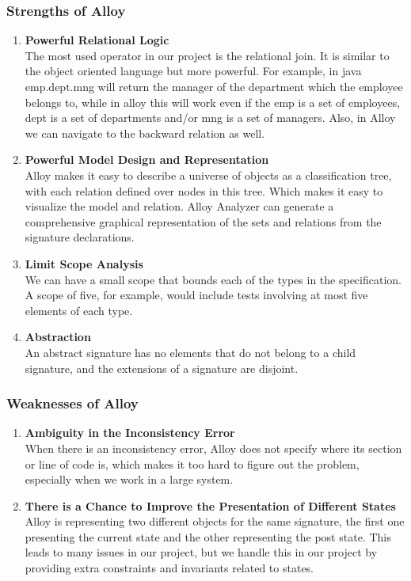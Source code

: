 \documentclass[titlepage]{article}
\begin{document}
\subsubsection{Strengths of Alloy}
\begin{enumerate}
	\item \textbf{Powerful Relational Logic} \\
	      The most used operator in our project is the relational join. It is similar to the object oriented language but more powerful. For example, in java emp.dept.mng will return the manager of the department which the employee belongs to, while in alloy this will work even if the emp is a set of employees, dept is a set of departments and/or mng is a set of managers. Also, in Alloy we can navigate to the backward relation as well.
	\item \textbf{Powerful Model Design and Representation} \\
	      Alloy makes it easy to describe a universe of objects as a classification tree, with each relation defined over nodes in this tree. Which makes it easy to visualize the model and relation. Alloy Analyzer can generate a comprehensive graphical representation of the sets and relations from the signature declarations.
	\item \textbf{Limit Scope Analysis} \\
	      We can have a small scope that bounds each of the types in the specification. A scope of five, for example, would include tests involving at most five elements of each type.
	\item \textbf{Abstraction} \\
	      An abstract signature has no elements that do not belong to a child signature, and the extensions of a signature are disjoint.
\end{enumerate}
\subsubsection{Weaknesses of Alloy}
\begin{enumerate}
	\item \textbf{Ambiguity in the Inconsistency Error} \\
	      When there is an inconsistency error, Alloy does not specify where its section or line of code is, which makes it too hard to figure out the problem, especially when we work in a large system.
	\item \textbf{There is a Chance to Improve the Presentation of Different States} \\
	      Alloy is representing two different objects for the same signature, the first one presenting the current state and the other representing the post state. This leads to many issues in our project, but we handle this in our project by providing extra constraints and invariants related to states.
\end{enumerate}
\end{document}

